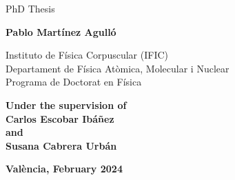 \begin{center}

\vspace{0.5cm}

{\Large PhD Thesis}


\vspace{1.5cm}


\textbf{\Large{Pablo Martínez Agulló}}\\ %

\vspace{0.5cm}

{Instituto de F\' isica Corpuscular (IFIC) }\\
{Departament de Física Atòmica, Molecular i Nuclear}\\
{Programa de Doctorat en Física}\\

\vspace{1cm}



\textbf{Under the supervision of}\\[3ex]

{\large \textbf{Carlos Escobar Ibáñez}} \\
{\textbf{and}} \\
{\large \textbf{Susana Cabrera Urbán}} \\

\vspace{1.5cm}

{\large \bf{Val\`{e}ncia, February 2024}}

\end{center}